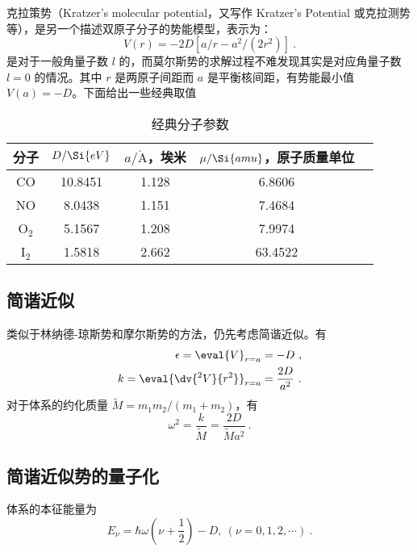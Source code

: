 

克拉策势（Kratzer's molecular potential，又写作 Kratzer's Potential 或克拉测势等），是另一个描述双原子分子的势能模型，表示为：
\begin{equation}
V(r) = -2D [a/r - a^2/(2r^2)] ~.
\end{equation}
是对于一般角量子数 $l$ 的，而莫尔斯势的求解过程不难发现其实是对应角量子数 $l=0$ 的情况。其中 $r$ 是两原子间距而 $a$ 是平衡核间距，有势能最小值 $V(a) = -D$。下面给出一些经典取值
\begin{table}[ht]
\centering
\caption{经典分子参数}\label{tab_kratPo1}
\begin{tabular}{|c|c|c|c|c|}
\hline
分子 & $D/\Si{eV}$ & $a/\mathring{\text{A}}$，埃米 & $\mu/\Si{amu}$，原子质量单位\\
\hline
CO & 10.8451 & 1.128 & 6.8606 \\
\hline
NO & 8.0438 & 1.151 & 7.4684 \\
\hline
O$_2$ & 5.1567 & 1.208 & 7.9974 \\
\hline
I$_2$ & 1.5818 & 2.662 & 63.4522 \\
\hline
\end{tabular}
\end{table}

\subsection{简谐近似}
类似于林纳德-琼斯势和摩尔斯势的方法，仍先考虑简谐近似。有
\begin{equation}
\begin{aligned}
\epsilon = \eval{V}_{r=a} &= -D ~, \\
k = \eval{\dv{^2 V}{r^2}}_{r=a} &= \frac{2D}{a^2} ~.
\end{aligned}
\end{equation}
对于体系的约化质量 $\widetilde M = m_1m_2/(m_1+m_2)$，有
$$\omega^2 = \frac{k}{\widetilde M} = \frac{2D}{\widetilde M a^2} ~.$$

\subsection{简谐近似势的量子化}
体系的本征能量为
\begin{equation}
E_\nu = \hbar \omega\left(\nu + \frac12\right) - D, \ (\nu = 0, 1, 2, \cdots) ~.
\end{equation}

